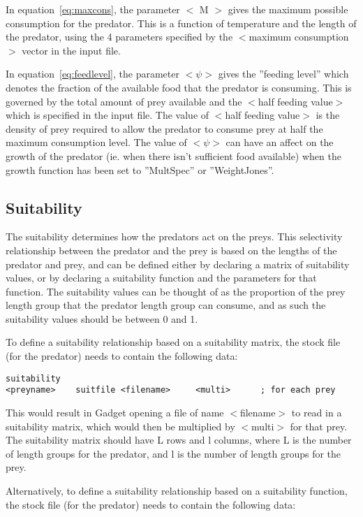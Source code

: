\documentclass [a4paper, 10pt]{book}
\begin{document}
\bigskip
In equation~\ref{eq:maxcons}, the parameter $<$ M $>$ gives the maximum possible consumption for the predator.  This is a function of temperature and the length of the predator, using the 4 parameters specified by the $<$maximum consumption$>$ vector in the input file.

\bigskip
In equation~\ref{eq:feedlevel}, the parameter $<\psi>$ gives the ''feeding level'' which denotes the fraction of the available food that the predator is consuming.  This is governed by the total amount of prey available and the $<$half feeding value$>$ which is specified in the input file.  The value of $<$half feeding value$>$ is the density of prey required to allow the predator to consume prey at half the maximum consumption level.  The value of $<\psi>$ can have an affect on the growth of the predator (ie. when there isn't sufficient food available) when the growth function has been set to ''MultSpec'' or ''WeightJones''.

\subsection{Suitability}\label{subsec:suitability}
The suitability determines how the predators act on the preys.  This selectivity relationship between the predator and the prey is based on the lengths of the predator and prey, and can be defined either by declaring a matrix of suitability values, or by declaring a suitability function and the parameters for that function.  The suitability values can be thought of as the proportion of the prey length group that the predator length group can consume, and as such the suitability values should be between 0 and 1.

\bigskip
To define a suitability relationship based on a suitability matrix, the stock file (for the predator) needs to contain the following data:

{\small\begin{verbatim}
suitability
<preyname>    suitfile <filename>     <multi>      ; for each prey
\end{verbatim}}

This would result in Gadget opening a file of name $<$filename$>$ to read in a suitability matrix, which would then be multiplied by $<$multi$>$ for that prey.  The suitability matrix should have L rows and l columns, where L is the number of length groups for the predator, and l is the number of length groups for the prey.

\bigskip
Alternatively, to define a suitability relationship based on a suitability function, the stock file (for the predator) needs to contain the following data:
\end{document}
